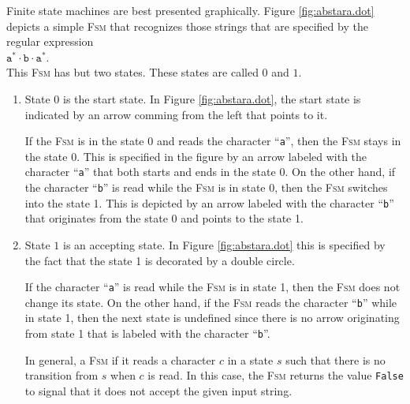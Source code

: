 \noindent
Finite state machines are best presented graphically.  Figure \ref{fig:abstara.dot} depicts a simple
\textsc{Fsm} that recognizes those strings that are specified by the regular expression
\\[0.2cm]
\hspace*{1.3cm}
$\texttt{a}^*\cdot\texttt{b}\cdot\texttt{a}^*$.
\\[0.2cm]
This \textsc{Fsm} has but two states.  These states are called $0$ and $1$.
\begin{enumerate}
\item State $0$  is the start state.  In Figure \ref{fig:abstara.dot}, the start state is indicated by an arrow
      comming from the left that points to it.  
  
      If the \textsc{Fsm} is in the state 0 and reads the character ``\texttt{a}'', then the
      \textsc{Fsm} stays in the state 0.  This is specified in the figure by an arrow labeled with the
      character ``\texttt{a}'' that both starts and ends in the state 0.  On the other hand, if the
      character ``\texttt{b}'' is read while the \textsc{Fsm} is in state 0, then the \textsc{Fsm}
      switches into the state 1.  This is depicted by an arrow labeled with the character
      ``\texttt{b}'' that originates from the state 0 and points to the state 1.
\item State  $1$ is an accepting state. In Figure \ref{fig:abstara.dot} this is specified by the
      fact that the state 1 is decorated by a double circle.

      If the character ``\texttt{a}'' is read while the \textsc{Fsm} is in state 1, then the
      \textsc{Fsm} does not change its state.  On the other hand, if the \textsc{Fsm} reads the
      character ``\texttt{b}'' while in state 1, then the next state is undefined since there is no
      arrow originating from state 1 that is labeled with the character ``\texttt{b}''.

      In general, a \textsc{Fsm}  
      if it reads a character $c$ in a state $s$ such that there is no transition from $s$ when $c$ is read.
      In this case, the \textsc{Fsm} returns the value \texttt{False} to signal that it does not accept the given
      input string.
\end{enumerate}

